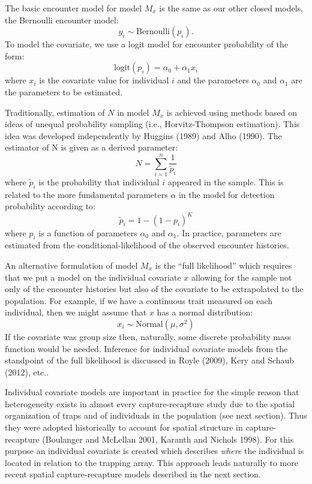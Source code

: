 \documentclass{book}
\begin{document}
The basic encounter model for model $M_x$ is the same as our other
closed models, the Bernoulli encounter model:
\[
y_{i} \sim \mbox{Bernoulli}(p_{i}).
\]
To model the covariate, we use a logit model for encounter probability
of the form:
\begin{equation}
 \mbox{logit}(p_{i}) = \alpha_0 + \alpha_1 x_{i}
\end{equation}
where $x_i$ is the covariate value for individual $i$ and the
parameters $\alpha_0$ and $\alpha_1$ are the parameters to be
estimated.

Traditionally, estimation of $N$ in model $M_{x}$ is achieved using
methods based on ideas of unequal probability sampling (i.e.,
Horvitz-Thompson estimation). This idea was developed independently by
Huggins (1989) and Alho (1990). The estimator of N is given as a
derived parameter:
\[
\hat{N} = \sum_{i=1}^{n} \frac{1}{\tilde{p}_{i}}
\]
where $\tilde{p}_{i}$ is the probability that individual $i$ appeared
in the sample.  This is related to the more fundamental parameters
$\alpha$ in the model for detection probability according to:
\[
\tilde{p}_{i}  = 1- (1-p_{i})^K
\]
where $p_{i}$ is a function of parameters $\alpha_{0}$ and
$\alpha_{1}$.  In practice, parameters are estimated from the
conditional-likelihood of the observed encounter histories.

An alternative formulation of model $M_x$ is the ``full likelihood''
which requires that we put a model on the individual covariate $x$
allowing for the sample not only of the encounter histories but also
of the covariate to be extrapolated to the population.  For example,
if we have a continuous trait measured on each individual, then we
might assume that $x$ has a normal distribution:
\[
x_{i} \sim \mbox{Normal}(\mu,\sigma^{2})
\]
If the covariate was group size then, naturally, some discrete
probability mass function would be needed. Inference for individual
covariate models from the standpoint of the  full likelihood is
discussed in Royle (2009), Kery and Schaub (2012), etc..

Individual covariate models are important in practice for the simple
reason that heterogeneity exists in almost every capture-recapture
study due to the spatial organization of traps and of individuals in
the population (see next section). Thus they were adopted historically
to account for spatial structure in capture-recapture (Boulanger and
McLellan 2001, Karanth and Nichols 1998).  For this purpose an
individual covariate is created which describes {\it where} the
individual is located in relation to the trapping array.  This
approach leads naturally to more recent spatial capture-recapture
models described in the next section.
\end{document}
